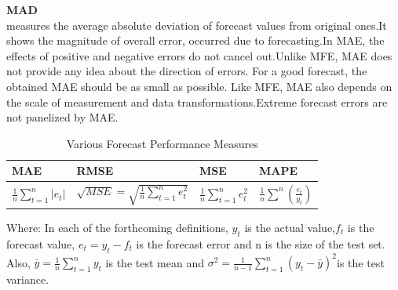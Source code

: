 \textbf{MAD}\\
measures the average absolute deviation of forecast values from   original ones.It shows the magnitude of overall error, occurred due to forecasting.In MAE, the effects of positive and negative errors do not cancel out.Unlike MFE, MAE does not provide any idea about the direction of  errors. For a good forecast, the obtained MAE should be as small as possible. Like MFE, MAE also depends on the scale of measurement and data   transformations.Extreme forecast errors are not panelized by MAE.\\
	\begin{table}[]
		\label{table:Performance Measures}
		\caption{Various Forecast Performance Measures}
		\centering
		\addtolength{\tabcolsep}{30pt}
		\begin{tabularx}{\textwidth}{@{}llll@{}}
			\toprule \hline
			MAE	&  RMSE   &  MSE   &  MAPE  \\ \midrule
			
			$\displaystyle  \frac{1}{n}\sum_{t=1}^{n}|e_{t}|$	& $\displaystyle  \sqrt{MSE} = \sqrt {\frac{1}{n}\sum_{t=1}^{n}e^{2}_{t}}$    & $\displaystyle  \frac{1}{n}\sum_{t=1}^{n}e^{2}_{t}$    & $\displaystyle  \frac{1}{n}\sum^{n}\left(\frac{e_{t}}{y_{t}}\right)$   \\ \bottomrule
			
		\end{tabularx}
	\end{table}
Where: In each of the forthcoming definitions, $y_{t }$ is the actual value,$f_{t}$ is the forecast value, $e_{t} = y_{t} - f_{t}$ is the forecast error and n is the size of the test set. Also, $\displaystyle \bar{y} = \frac{1}{n}\sum_{t=1}^{n}y_{t}$ is the test mean and $\displaystyle \sigma^{2} = \frac{1}{n-1}\sum_{t=1}^{n}(y_{t}-\bar{y})^{2}$is the test variance.

